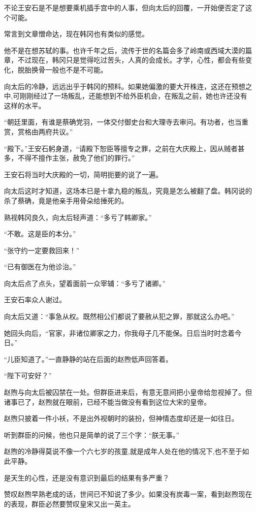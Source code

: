 不论王安石是不是想要乘机插手宫中的人事，但向太后的回覆，一开始便否定了这个可能。

常言到文章憎命达，现在韩冈也有类似的感觉。

他不是在想苏轼的事。也许千年之后，流传于世的名篇会多了岭南或西域大漠的篇章，不过现在，韩冈只是觉得吃过苦头，人真的会成长。才学，心性，都会有些变化，脱胎换骨一般也不是不可能。

向太后的冷静，远远出乎于韩冈的预料。如果她偏激的要大开株连，这还在预想之中,可刚刚经过了一场叛乱，还能想到不给外臣机会，在叛乱之前，她也许还没有这样的水平。

“朝廷里面，有谁是蔡确党羽，一体交付御史台和大理寺去审问。有功者，也当重赏，赏格由两府共议。”

“殿下。”王安石躬身道，“请殿下恕臣等擅专之罪，之前在大庆殿上，因从贼者甚多，不得不擅作主张，赦免了他们的罪行。”

王安石将当时大庆殿的一切，简明扼要的说了一遍。

向太后这时才知道，这场本已是十拿九稳的叛乱，究竟是怎么被翻了盘。韩冈说的杀了蔡确，竟是他亲手用骨朵给捶死的。

熟视韩冈良久，向太后轻声道：“多亏了韩卿家。”

“不敢。这是臣的本分。”

“张守约一定要救回来！”

“已有御医在为他诊治。”

向太后点了点头，望着面前一众宰辅：“多亏了诸卿。”

王安石率众人谢过。

向太后又道：“事急从权。既然相公们都说了要赦从犯之罪，那就这么办吧。”

她回头向后，“官家，非诸位卿家之力，你我母子几不能保。日后当时时念着今日。”

“儿臣知道了。”一直静静的站在后面的赵煦低声回答着。

“陛下可安好？”

赵煦与向太后被囚禁在一处。但群臣进来后，有意无意间把小皇帝给忽视掉了。但诸事已了，赵煦就在眼前，已经不能当做没有看到这位大宋的皇帝。

赵煦只披着一件小袄，不是出外视朝时的装扮，但神情态度却还是一如往日。

听到群臣的问候，他也只是简单的说了三个字：“朕无事。”

赵煦的冷静得莫说不像一个六七岁的孩童,就是成年人处在他的情况下,也不至于如此平静。

是天生的心性，还是没有意识到最后的结果有多严重？

赞叹赵煦早熟老成的话，世间已不知说了多少。如果没有炭毒一案，看到赵煦现在的表现，群臣必然要赞叹皇宋又出一英主。

